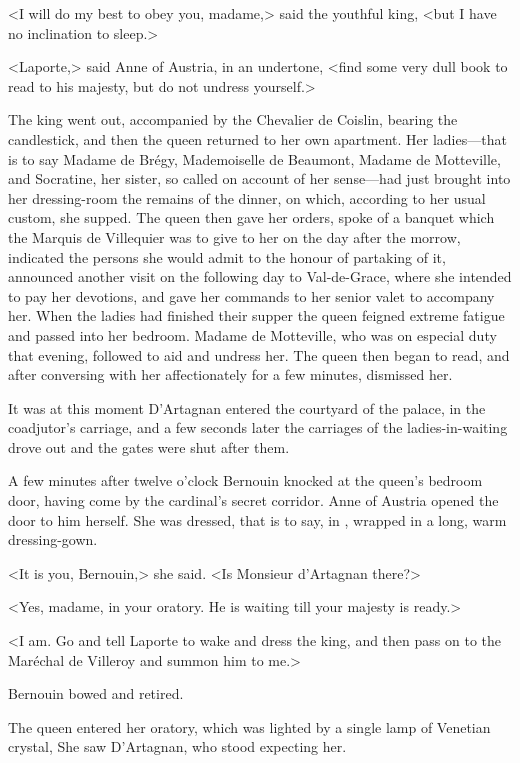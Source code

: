 <I will do my best to obey you, madame,> said the youthful king, <but I have no inclination to sleep.>

<Laporte,> said Anne of Austria, in an undertone, <find some very dull book to read to his majesty, but do not undress yourself.>

The king went out, accompanied by the Chevalier de Coislin, bearing the candlestick, and then the queen returned to her own apartment. Her ladies—that is to say Madame de Brégy, Mademoiselle de Beaumont, Madame de Motteville, and Socratine, her sister, so called on account of her sense—had just brought into her dressing-room the remains of the dinner, on which, according to her usual custom, she supped. The queen then gave her orders, spoke of a banquet which the Marquis de Villequier was to give to her on the day after the morrow, indicated the persons she would admit to the honour of partaking of it, announced another visit on the following day to Val-de-Grace, where she intended to pay her devotions, and gave her commands to her senior valet to accompany her. When the ladies had finished their supper the queen feigned extreme fatigue and passed into her bedroom. Madame de Motteville, who was on especial duty that evening, followed to aid and undress her. The queen then began to read, and after conversing with her affectionately for a few minutes, dismissed her.

It was at this moment D'Artagnan entered the courtyard of the palace, in the coadjutor's carriage, and a few seconds later the carriages of the ladies-in-waiting drove out and the gates were shut after them.

A few minutes after twelve o'clock Bernouin knocked at the queen's bedroom door, having come by the cardinal's secret corridor. Anne of Austria opened the door to him herself. She was dressed, that is to say, in , wrapped in a long, warm dressing-gown.

<It is you, Bernouin,> she said. <Is Monsieur d'Artagnan there?>

<Yes, madame, in your oratory. He is waiting till your majesty is ready.>

<I am. Go and tell Laporte to wake and dress the king, and then pass on to the Maréchal de Villeroy and summon him to me.>

Bernouin bowed and retired.

The queen entered her oratory, which was lighted by a single lamp of Venetian crystal, She saw D'Artagnan, who stood expecting her.

